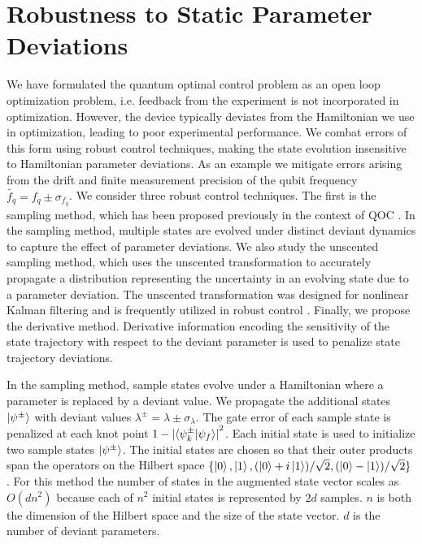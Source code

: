 \section{Robustness to Static Parameter Deviations \label{sec:static}}
We have formulated the quantum optimal control
problem as an open loop optimization problem, i.e.
feedback from the experiment is not incorporated in optimization.
However, the device typically deviates from the Hamiltonian we use in optimization,
leading to poor experimental performance. We combat errors
of this form using robust control techniques,
making the state evolution insensitive
to Hamiltonian parameter deviations. As an example
we mitigate errors arising from the drift and finite measurement
precision of the qubit frequency $\tilde{f_{q}} = f_{q} \pm \sigma_{f_{q}}$.
We consider three robust control techniques.
The first is the sampling method, which has
been proposed previously in the context of QOC
\cite{rembold2020introduction, reinhold2019controlling, carvalho2020error}. In the
sampling method, multiple states are evolved under distinct deviant dynamics
to capture the effect of parameter deviations. We also
study the unscented sampling method, which uses the unscented
transformation to accurately propagate a distribution
representing the uncertainty in an evolving state
due to a parameter deviation.
The unscented transformation was designed for nonlinear Kalman
filtering and is frequently utilized in robust control
\cite{howell2020direct, julier2004unscented, lee2013sigma, manchester2016derivative}.
Finally, we propose the derivative method. Derivative
information encoding the sensitivity of the
state trajectory with respect to the deviant parameter
is used to penalize state trajectory deviations.

In the sampling method, sample states evolve under a
Hamiltonian where a parameter is replaced by
a deviant value. We propagate the additional states $\ket{\psi^{\pm}}$ with
deviant values $\lambda^{\pm} = \lambda \pm \sigma_{\lambda}$.
The gate error of each sample state is 
penalized at each knot point
$1 - {\lvert \braket{\psi^{\pm}_{k} | \psi_{f}} \rvert}^{2}$.
Each initial state is used to initialize two
sample states $\ket{\psi^{\pm}}$.
The initial states are chosen so
that their outer products span the operators on the
Hilbert space $\{\ket{0}, \ket{1}, (\ket{0} + i\ket{1}) / \sqrt{2},
(\ket{0} - \ket{1}) / \sqrt{2}\}$ \cite{chow2009randomized}.
For this method the number of states in the augmented state vector
scales as $O(dn^{2})$ because each of $n^{2}$ initial
states is represented by $2d$ samples. $n$ is both the dimension of the Hilbert space
and the size of the state vector. $d$ is the number of deviant parameters.


